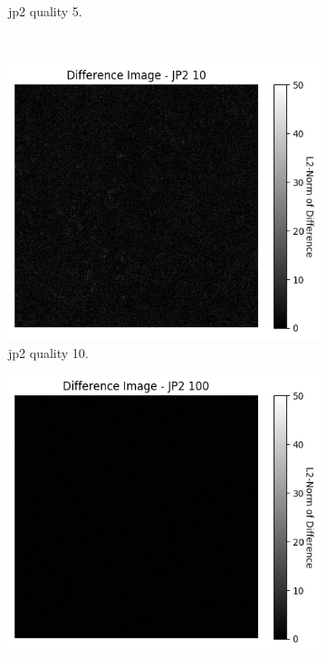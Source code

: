 \begin{figure}[htb]
\begin{subfigure}[b]{0.49\textwidth}
            \caption{\gls{jp2} quality 5.}
            \label{fig:img_quality_center_heatmap_5}
        \end{subfigure}
        \\
        \begin{subfigure}[b]{0.49\textwidth}
            \centering
            \includegraphics[width=\textwidth]{doc/thesis/0_figures/compare_quality/set1/jp2_10_center_diff_heatmap.png}
            \caption{\gls{jp2} quality 10.}
            \label{fig:img_quality_center_heatmap_10}
        \end{subfigure}
        \begin{subfigure}[b]{0.49\textwidth}
            \centering
            \includegraphics[width=\textwidth]{doc/thesis/0_figures/compare_quality/set1/jp2_100_center_diff_heatmap.png}

\end{subfigure}
\end{figure}
